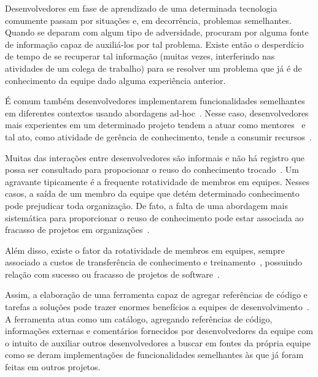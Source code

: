 
Desenvolvedores em fase de aprendizado de uma determinada tecnologia comumente passam por situações e, em decorrência,  problemas semelhantes. Quando se deparam com algum tipo de adversidade, procuram por alguma fonte de informação capaz de auxiliá-los por tal problema. Existe então o desperdício de tempo de se recuperar tal informação (muitas vezes, interferindo nas atividades de um colega de trabalho) para se resolver um problema que já é de conhecimento da equipe dado alguma experiência anterior.


É comum também desenvolvedores implementarem funcionalidades semelhantes em diferentes contextos usando abordagens ad-hoc~\cite{SangMok2011}.
Nesse caso, desenvolvedores mais experientes em um determinado projeto tendem a atuar como mentores~\cite{CubraniC2004} e tal ato, como atividade de gerência de conhecimento, tende a consumir recursos~\cite{Wiig2003}. Muitas das interações entre desenvolvedores são informais e não há registro que possa ser consultado para propocionar o reuso do conhecimento trocado~\cite{Olson2000}. Um agravante tipicamente é a frequente rotatividade de membros em equipes. Nesses casos, a saída de um membro da equipe que detém determinado conhecimento pode prejudicar toda organização. De fato, a falta de uma abordagem mais sistemática para proporcionar o reuso de conhecimento pode estar associada ao fracasso de projetos em organizações~\cite{Hall2008}.



Além disso, existe o fator da rotatividade de membros em equipes, sempre associado a custos de transferência de conhecimento e treinamento~\cite{Hall2008}, possuindo relação com sucesso ou fracasso de projetos de software~\cite{Hall2008}.

Assim, a elaboração de uma ferramenta capaz de agregar referências de código e tarefas a soluções pode trazer enormes benefícios a equipes de desenvolvimento~\cite{CubraniC2004}. A ferramenta atua como um catálogo, agregando referências de código, informações externas e comentários fornecidos por desenvolvedores da equipe com o intuito de auxiliar outros desenvolvedores a buscar em fontes da própria equipe como se deram implementações de funcionalidades semelhantes às que já foram feitas em outros projetos.

